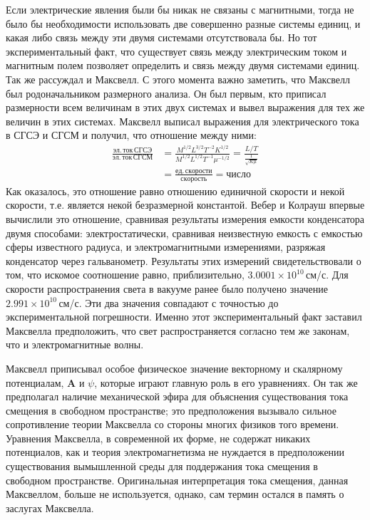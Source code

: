 \documentclass[12pt, oneside, a4paper]{article}
\begin{document}
Если электрические явления были бы никак не связаны с магнитными, тогда не было бы необходимости использовать две совершенно разные системы единиц, и какая либо связь между эти двумя системами отсутствовала бы. Но тот экспериментальный факт, что существует связь между электрическим током и магнитным полем позволяет определить и связь между двумя системами единиц. Так же рассуждал и Максвелл. С этого момента важно заметить, что Максвелл был родоначальником размерного анализа. Он был первым, кто приписал размерности всем величинам в этих двух системах и вывел выражения для тех же величин в этих системах. Максвелл выписал выражения для электрического тока в СГСЭ и СГСМ и получил, что отношение между ними:
\begin{align*}
\frac{эл.\,ток\,СГСЭ}{эл.\,ток\,СГСМ}&=\frac{M^{1/2}L^{3/2}T^{-2}K^{1/2}}{M^{1/2}L^{1/2}T^{-1}\mu^{-1/2}}=\frac{L/T}{\frac{1}{\sqrt{K\mu}}}\\&=\frac{ед.\, скорости}{скорость}=число
\end{align*}
Как оказалось, это отношение равно отношению единичной скорости и некой скорости, т.е. является некой безразмерной константой. Вебер и Колрауш впервые вычислили это отношение, сравнивая результаты измерения емкости конденсатора двумя способами: электростатически, сравнивая неизвестную емкость с емкостью сферы известного радиуса, и электромагнитными измерениями, разряжая конденсатор через гальванометр. Результаты этих измерений свидетельствовали о том, что искомое соотношение равно, приблизительно, $3.0001\times{}10^{10}$\,см/с. Для скорости распространения света в вакууме ранее было получено значение $2.991\times{}10^{10}$\,см/с. Эти два значения совпадают с точностью до экспериментальной погрешности. Именно этот экспериментальный факт заставил Максвелла предположить, что свет распространяется согласно тем же законам, что и электромагнитные волны. 

Максвелл приписывал особое физическое значение векторному и скалярному потенциалам, $\mathbf{A}$ и $\psi$, которые играют главную роль в его уравнениях. Он так же предполагал наличие механической эфира для объяснения существования тока смещения в свободном пространстве; это предположения вызывало сильное сопротивление теории Максвелла со стороны многих физиков того времени. Уравнения Максвелла, в современной их форме, не содержат никаких потенциалов, как и теория электромагнетизма не нуждается в предположении существования вымышленной среды для поддержания тока смещения в свободном пространстве. Оригинальная интерпретация тока смещения, данная Максвеллом, больше не используется, однако, сам термин остался в память о заслугах Максвелла. 
\end{document}
